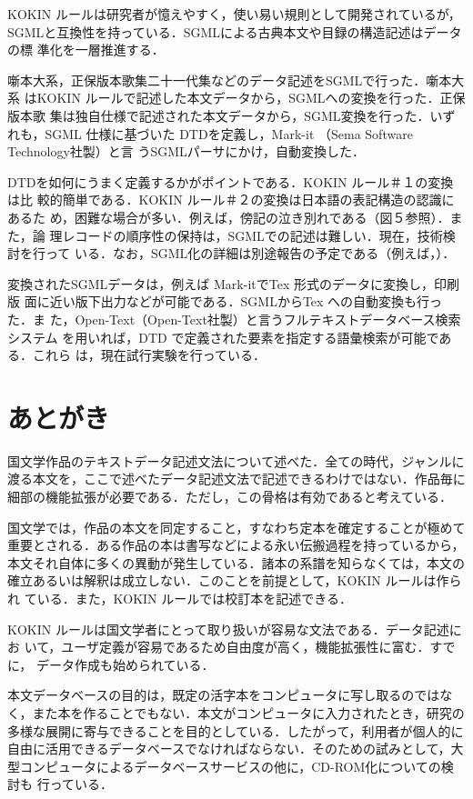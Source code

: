 KOKIN ルールは研究者が憶えやすく，使い易い規則として開発されているが，
SGMLと互換性を持っている．SGMLによる古典本文や目録の構造記述はデータの標
準化を一層推進する．

噺本大系，正保版本歌集二十一代集などのデータ記述をSGMLで行った．噺本大系
はKOKIN ルールで記述した本文データから，SGMLへの変換を行った．正保版本歌
集は独自仕様で記述された本文データから，SGML変換を行った．いずれも，SGML
仕様に基づいた DTDを定義し，Mark-it （Sema Software Technology社製）と言
うSGMLパーサにかけ，自動変換した．

DTDを如何にうまく定義するかがポイントである．KOKIN ルール＃１の変換は比
較的簡単である．KOKIN ルール＃２の変換は日本語の表記構造の認識にあるた
め，困難な場合が多い．例えば，傍記の泣き別れである（図５参照）．また，論
理レコードの順序性の保持は，SGMLでの記述は難しい．現在，技術検討を行って
いる．なお，SGML化の詳細は別途報告の予定である（例えば，\cite{hara:95}）．

変換されたSGMLデータは，例えば Mark-itでTex 形式のデータに変換し，印刷版
面に近い版下出力などが可能である．SGMLからTex への自動変換も行った．ま
た，Open-Text（Open-Text社製）と言うフルテキストデータベース検索システム
を用いれば，DTD で定義された要素を指定する語彙検索が可能である．これら
は，現在試行実験を行っている．



\section{あとがき}
\label{sec:6shou}

国文学作品のテキストデータ記述文法について述べた．全ての時代，ジャンルに
渡る本文を，ここで述べたデータ記述文法で記述できるわけではない．作品毎に
細部の機能拡張が必要である．ただし，この骨格は有効であると考えている．

国文学では，作品の本文を同定すること，すなわち定本を確定することが極めて
重要とされる．ある作品の本は書写などによる永い伝搬過程を持っているから，
本文それ自体に多くの異動が発生している．諸本の系譜を知らなくては，本文の
確立あるいは解釈は成立しない．このことを前提として，KOKIN ルールは作られ
ている．また，KOKIN ルールでは校訂本を記述できる．

KOKIN ルールは国文学者にとって取り扱いが容易な文法である．データ記述にお
いて，ユーザ定義が容易であるため自由度が高く，機能拡張性に富む．すでに，
データ作成も始められている．

本文データベースの目的は，既定の活字本をコンピュータに写し取るのではな
く，また本を作ることでもない．本文がコンピュータに入力されたとき，研究の
多様な展開に寄与できることを目的としている．したがって，利用者が個人的に
自由に活用できるデータベースでなければならない．そのための試みとして，大
型コンピュータによるデータベースサービスの他に，CD-ROM化についての検討も
行っている．

